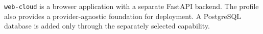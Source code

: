 \begin{beginnerstatement}

\texttt{web-cloud} is a browser application with a separate FastAPI backend.
The profile also provides a provider-agnostic foundation for deployment. A
PostgreSQL database is added only through the separately selected capability.

\end{beginnerstatement}

